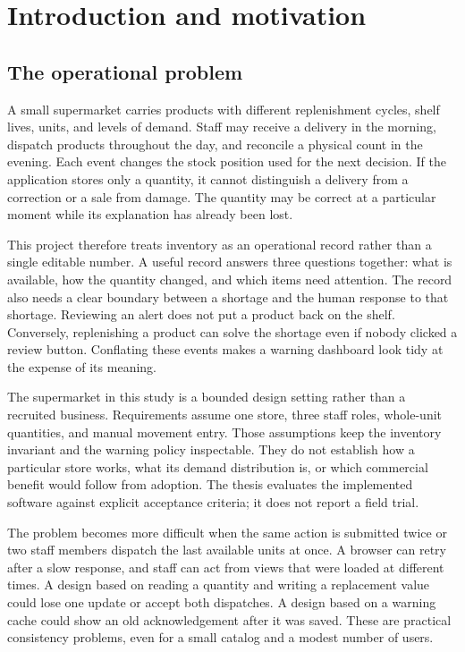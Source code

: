 \chapter{Introduction and motivation}\label{ch:introduction}
\section{The operational problem}
A small supermarket carries products with different replenishment cycles, shelf lives, units, and levels of demand. Staff may receive a delivery in the morning, dispatch products throughout the day, and reconcile a physical count in the evening. Each event changes the stock position used for the next decision. If the application stores only a quantity, it cannot distinguish a delivery from a correction or a sale from damage. The quantity may be correct at a particular moment while its explanation has already been lost.

This project therefore treats inventory as an operational record rather than a single editable number. A useful record answers three questions together: what is available, how the quantity changed, and which items need attention. The record also needs a clear boundary between a shortage and the human response to that shortage. Reviewing an alert does not put a product back on the shelf. Conversely, replenishing a product can solve the shortage even if nobody clicked a review button. Conflating these events makes a warning dashboard look tidy at the expense of its meaning.

The supermarket in this study is a bounded design setting rather than a recruited business. Requirements assume one store, three staff roles, whole-unit quantities, and manual movement entry. Those assumptions keep the inventory invariant and the warning policy inspectable. They do not establish how a particular store works, what its demand distribution is, or which commercial benefit would follow from adoption. The thesis evaluates the implemented software against explicit acceptance criteria; it does not report a field trial.

The problem becomes more difficult when the same action is submitted twice or two staff members dispatch the last available units at once. A browser can retry after a slow response, and staff can act from views that were loaded at different times. A design based on reading a quantity and writing a replacement value could lose one update or accept both dispatches. A design based on a warning cache could show an old acknowledgement after it was saved. These are practical consistency problems, even for a small catalog and a modest number of users.

